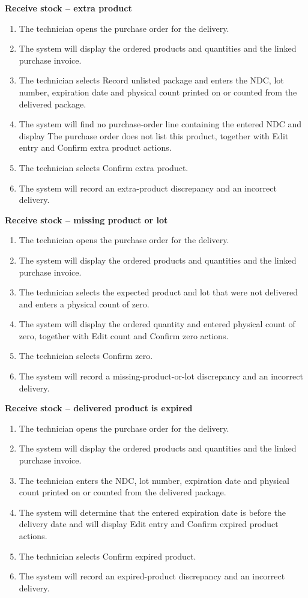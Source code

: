 \textbf{Receive stock -- extra product}
\begin{enumerate}
\item The technician opens the purchase order for the delivery.
\item The system will display the ordered products and quantities and the linked purchase invoice.
\item The technician selects Record unlisted package and enters the NDC, lot number, expiration date and physical count printed on or counted from the delivered package.
\item The system will find no purchase-order line containing the entered NDC and display The purchase order does not list this product, together with Edit entry and Confirm extra product actions.
\item The technician selects Confirm extra product.
\item The system will record an extra-product discrepancy and an incorrect delivery.
\end{enumerate}

\textbf{Receive stock -- missing product or lot}
\begin{enumerate}
\item The technician opens the purchase order for the delivery.
\item The system will display the ordered products and quantities and the linked purchase invoice.
\item The technician selects the expected product and lot that were not delivered and enters a physical count of zero.
\item The system will display the ordered quantity and entered physical count of zero, together with Edit count and Confirm zero actions.
\item The technician selects Confirm zero.
\item The system will record a missing-product-or-lot discrepancy and an incorrect delivery.
\end{enumerate}

\textbf{Receive stock -- delivered product is expired}
\begin{enumerate}
\item The technician opens the purchase order for the delivery.
\item The system will display the ordered products and quantities and the linked purchase invoice.
\item The technician enters the NDC, lot number, expiration date and physical count printed on or counted from the delivered package.
\item The system will determine that the entered expiration date is before the delivery date and will display Edit entry and Confirm expired product actions.
\item The technician selects Confirm expired product.
\item The system will record an expired-product discrepancy and an incorrect delivery.
\end{enumerate}

